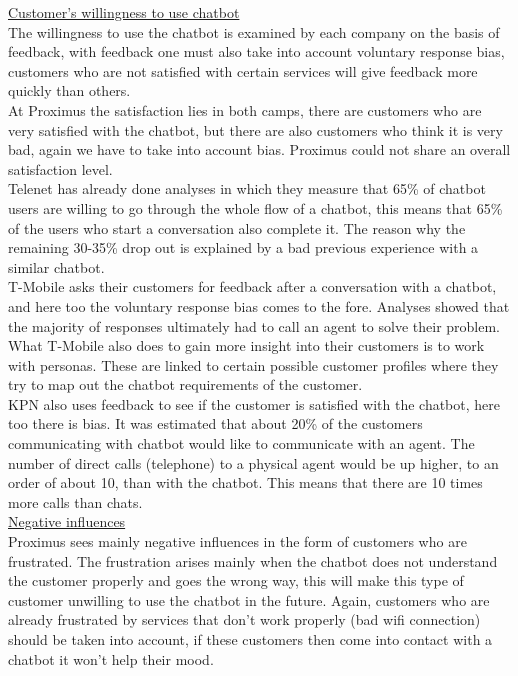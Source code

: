 \break
\ul{Customer's willingness to use chatbot}\\
The willingness to use the chatbot is examined by each company on the basis of feedback, with feedback one must also take into account voluntary response bias, customers who are not satisfied with certain services will give feedback more quickly than others.\\ 
\break
At Proximus the satisfaction lies in both camps, there are customers who are very satisfied with the chatbot, but there are also customers who think it is very bad, again we have to take into account bias. Proximus could not share an overall satisfaction level.\\
\break
Telenet has already done analyses in which they measure that 65\% of chatbot users are willing to go through the whole flow of a chatbot, this means that 65\% of the users who start a conversation also complete it. The reason why the remaining 30-35\% drop out is explained by a bad previous experience with a similar chatbot.\\
\break
T-Mobile asks their customers for feedback after a conversation with a chatbot, and here too the voluntary response bias comes to the fore. Analyses showed that the majority of responses ultimately had to call an agent to solve their problem. What T-Mobile also does to gain more insight into their customers is to work with personas. These are linked to certain possible customer profiles where they try to map out the chatbot requirements of the customer.\\
\break
KPN also uses feedback to see if the customer is satisfied with the chatbot, here too there is bias. It was estimated that about 20\% of the customers communicating with chatbot would like to communicate with an agent. The number of direct calls (telephone) to a physical agent would be up higher, to an order of about 10, than with the chatbot. This means that there are 10 times more calls than chats.\\
\break
\ul{Negative influences}\\
Proximus sees mainly negative influences in the form of customers who are frustrated. The frustration arises mainly when the chatbot does not understand the customer properly and goes the wrong way, this will make this type of customer unwilling to use the chatbot in the future. Again, customers who are already frustrated by services that don't work properly (bad wifi connection) should be taken into account, if these customers then come into contact with a chatbot it won't help their mood.\\

